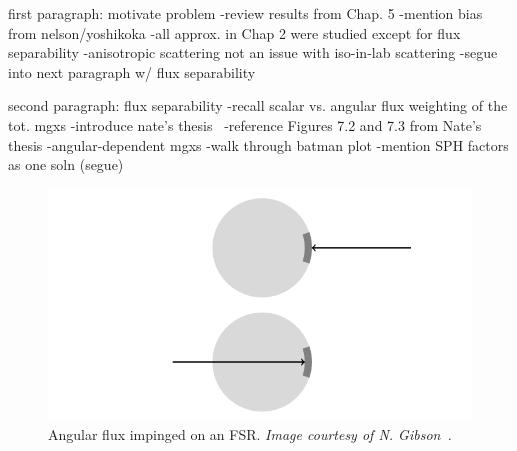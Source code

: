first paragraph: motivate problem
-review results from Chap. 5
-mention bias from nelson/yoshikoka 
-all approx. in Chap 2 were studied except for flux separability
-anisotropic scattering not an issue with iso-in-lab scattering
-segue into next paragraph w/ flux separability

second paragraph: flux separability
-recall scalar vs. angular flux weighting of the tot. mgxs
-introduce nate's thesis~\cite{gibson2016thesis}
  -reference Figures 7.2 and 7.3 from Nate's thesis
-angular-dependent mgxs
-walk through batman plot
-mention SPH factors as one soln (segue)


\begin{figure}[H]
  \centering
  \includegraphics[width=0.8\linewidth]{figures/sph/incoming-outgoing}
  \caption{}
\caption[Angular flux impinged on an FSR]{Angular flux impinged on an FSR. \textit{Image courtesy of N. Gibson~\cite{gibson2016thesis}.}}
\label{fig:chap6-incoming-outgoing}
\end{figure}

